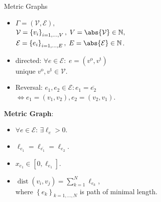 \documentclass[9pt]{beamer}
\begin{document}
\begin{frame}{Metric Graphs}
    \begin{minipage}{0.5\textwidth}
        \begin{itemize}
            \item $\Gamma = \left(\mathcal{V}, \mathcal{E} \right),$ \\ $\mathcal{V} = \left\{ v_i \right\}_{i = 1, \ldots, V}, \; V = \abs{\mathcal{V}} \in \mathbb{N},$ \\
            $\mathcal{E} = \left\{ e_i \right\}_{i = 1, \ldots, E}, \; E = \abs{\mathcal{E}} \in \mathbb{N}$.
            \item directed: $\forall e \in \mathcal{E} \colon \; e = \left( v^{\operatorname{o}}, v^{\operatorname{t}} \right)$ \\
            unique $v^{\operatorname{o}}, v^{\operatorname{t}} \in \mathcal{V}$.
            \item Reversal: $e_1, e_2 \in \mathcal{E} \colon e_1 = \overline{e_2}$ \\
            $\Leftrightarrow e_1 = \left( v_1, v_2 \right), e_2 = \left( v_2, v_1 \right)$.
        \end{itemize}
        \vspace{3mm}
        \textbf{Metric Graph}:
        \begin{itemize}
            \item $\forall e \in \mathcal{E} \colon \, \exists \ell_e > 0$.
            \item $\ell_{e_1} = \ell_{\overline{e_1}} = \ell_{e_2}$.
            \item $x_{e_1} \in [0, \ell_{e_1}]$.
            \item $\operatorname{dist}(v_i, v_j) = \sum^{N}_{k = 1} \ell_{e_k}$, \\ where $\left\{ e_k \right\}_{k = 1, \ldots, N}$ is path of minimal length.
        \end{itemize}
    \end{minipage} \hfill
    \begin{minipage}{0.45\textwidth}
        \begin{figure}[H]
            \resizebox{!}{!}
            {
            }
        \end{figure}
    \end{minipage}
\end{frame}
\end{document}
